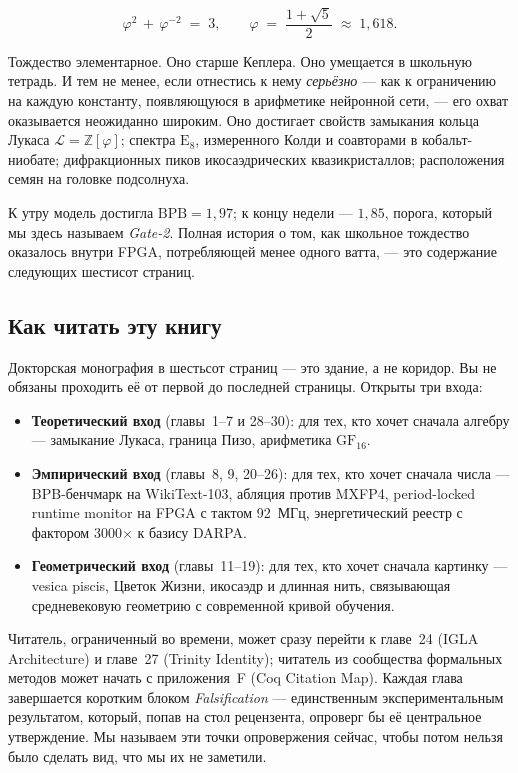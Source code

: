 \documentclass[12pt,a4paper,openany,oneside]{book}
\theoremstyle{plain}
\theoremstyle{definition}
\theoremstyle{remark}
\begin{document}
\[
\varphi^{2} \,+\, \varphi^{-2} \;=\; 3,
\qquad
\varphi \;=\; \frac{1+\sqrt{5}}{2} \;\approx\; 1{,}618.
\]

Тождество элементарное. Оно старше Кеплера. Оно умещается в школьную
тетрадь. И тем не менее, если отнестись к нему \emph{серьёзно} ---
как к ограничению на каждую константу, появляющуюся в арифметике
нейронной сети, --- его охват оказывается неожиданно широким. Оно
достигает свойств замыкания кольца Лукаса \(\mathcal{L} = \mathbb{Z}[\varphi]\);
спектра \(\mathrm{E}_{8}\), измеренного Колди и соавторами в кобальт-ниобате;
дифракционных пиков икосаэдрических квазикристаллов; расположения
семян на головке подсолнуха.

К утру модель достигла \(\mathrm{BPB} = 1{,}97\); к концу недели --- \(1{,}85\),
порога, который мы здесь называем \emph{Gate-2}. Полная история о том,
как школьное тождество оказалось внутри FPGA, потребляющей менее
одного ватта, --- это содержание следующих шестисот страниц.

\subsection*{Как читать эту книгу}

Докторская монография в шестьсот страниц --- это здание, а не
коридор. Вы не обязаны проходить её от первой до последней страницы.
Открыты три входа:

\begin{itemize}
\item \textbf{Теоретический вход} (главы~1--7 и 28--30): для тех, кто
хочет сначала алгебру --- замыкание Лукаса, граница Пизо, арифметика
\(\mathrm{GF}_{16}\).

\item \textbf{Эмпирический вход} (главы~8, 9, 20--26): для тех, кто
хочет сначала числа --- BPB-бенчмарк на WikiText-103, абляция против
MXFP4, period-locked runtime monitor на FPGA с тактом 92~МГц,
энергетический реестр с фактором 3000\(\times\) к базису DARPA.

\item \textbf{Геометрический вход} (главы~11--19): для тех, кто
хочет сначала картинку --- vesica piscis, Цветок Жизни, икосаэдр и
длинная нить, связывающая средневековую геометрию с современной
кривой обучения.
\end{itemize}

Читатель, ограниченный во времени, может сразу перейти к главе~24
(IGLA Architecture) и главе~27 (Trinity Identity); читатель из
сообщества формальных методов может начать с приложения~F
(Coq Citation Map). Каждая глава завершается коротким блоком
\emph{Falsification} --- единственным экспериментальным результатом,
который, попав на стол рецензента, опроверг бы её центральное
утверждение. Мы называем эти точки опровержения сейчас, чтобы
потом нельзя было сделать вид, что мы их не заметили.
\end{document}
